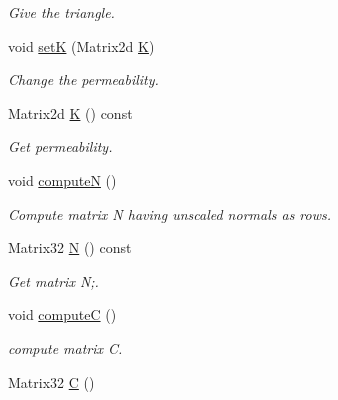 \begin{DoxyCompactItemize}
\begin{DoxyCompactList}\small\item\em Give the triangle. \end{DoxyCompactList}\item 
\hypertarget{classDarcy_1_1Biforc_a1451c7a710f536220cba1cb18801779a}{void \hyperlink{classDarcy_1_1Biforc_a1451c7a710f536220cba1cb18801779a}{set\-K} (Matrix2d \hyperlink{classDarcy_1_1Biforc_a62f510963e60c24ba57380e7ea3337af}{K})}\label{classDarcy_1_1Biforc_a1451c7a710f536220cba1cb18801779a}

\begin{DoxyCompactList}\small\item\em Change the permeability. \end{DoxyCompactList}\item 
\hypertarget{classDarcy_1_1Biforc_a62f510963e60c24ba57380e7ea3337af}{Matrix2d \hyperlink{classDarcy_1_1Biforc_a62f510963e60c24ba57380e7ea3337af}{K} () const }\label{classDarcy_1_1Biforc_a62f510963e60c24ba57380e7ea3337af}

\begin{DoxyCompactList}\small\item\em Get permeability. \end{DoxyCompactList}\item 
void \hyperlink{classDarcy_1_1Biforc_a12234283e832836d1e89bb480ba4fa9b}{compute\-N} ()
\begin{DoxyCompactList}\small\item\em Compute matrix N having unscaled normals as rows. \end{DoxyCompactList}\item 
\hypertarget{classDarcy_1_1Biforc_a93f664e4a8e2215f66315c958a80d504}{Matrix32 \hyperlink{classDarcy_1_1Biforc_a93f664e4a8e2215f66315c958a80d504}{N} () const }\label{classDarcy_1_1Biforc_a93f664e4a8e2215f66315c958a80d504}

\begin{DoxyCompactList}\small\item\em Get matrix N;. \end{DoxyCompactList}\item 
void \hyperlink{classDarcy_1_1Biforc_a893d75d07a8947f3f6764303aad2a0a3}{compute\-C} ()
\begin{DoxyCompactList}\small\item\em compute matrix C. \end{DoxyCompactList}\item 
\hypertarget{classDarcy_1_1Biforc_a3a09cd29eabeff78097c1afa38ad25a2}{Matrix32 \hyperlink{classDarcy_1_1Biforc_a3a09cd29eabeff78097c1afa38ad25a2}{C} ()}\label{classDarcy_1_1Biforc_a3a09cd29eabeff78097c1afa38ad25a2}


\end{DoxyCompactItemize}
